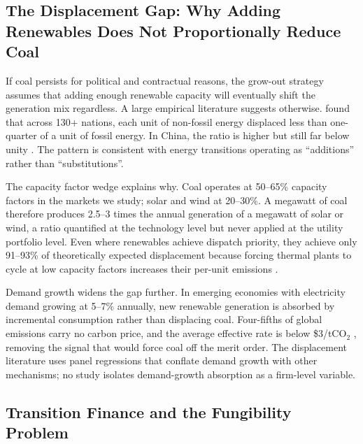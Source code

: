 \documentclass[review,3p,authoryear]{elsarticle}
\begin{document}
\subsection{The Displacement Gap: Why Adding Renewables Does Not Proportionally Reduce Coal}

If coal persists for political and contractual reasons, the grow-out strategy assumes that adding enough renewable capacity will eventually shift the generation mix regardless. A large empirical literature suggests otherwise. \citet{York2012} found that across 130+ nations, each unit of non-fossil energy displaced less than one-quarter of a unit of fossil energy. In China, the ratio is higher but still far below unity \citep{Zhu2017}. The pattern is consistent with energy transitions operating as ``additions'' rather than ``substitutions''.

The capacity factor wedge explains why. Coal operates at 50--65\% capacity factors in the markets we study; solar and wind at 20--30\%. A megawatt of coal therefore produces 2.5--3 times the annual generation of a megawatt of solar or wind, a ratio quantified at the technology level \citep{Patzek2023} but never applied at the utility portfolio level. Even where renewables achieve dispatch priority, they achieve only 91--93\% of theoretically expected displacement because forcing thermal plants to cycle at low capacity factors increases their per-unit emissions \citep{Suri2025}.

Demand growth widens the gap further. In emerging economies with electricity demand growing at 5--7\% annually, new renewable generation is absorbed by incremental consumption rather than displacing coal. Four-fifths of global emissions carry no carbon price, and the average effective rate is below \$3/tCO$_2$ \citep{Rafaty2025}, removing the signal that would force coal off the merit order. The displacement literature uses panel regressions that conflate demand growth with other mechanisms; no study isolates demand-growth absorption as a firm-level variable.

\subsection{Transition Finance and the Fungibility Problem}
\end{document}
